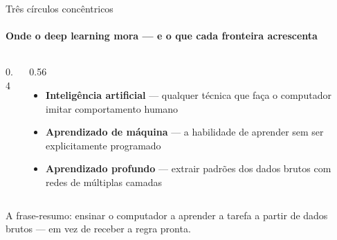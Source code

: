 \documentclass[aspectratio=169, 11pt]{beamer}
\begin{document}
\begin{frame}{Três círculos concêntricos}
  \framesubtitle{Onde o deep learning mora — e o que cada fronteira acrescenta}

  \begin{columns}[T]
    \begin{column}{0.4\textwidth}
      \begin{center}
      \end{center}
    \end{column}
    \begin{column}{0.56\textwidth}
      \begin{itemize}\setlength{\itemsep}{0.35ex}
        \item {\color{icNeural}\textbf{Inteligência artificial}} — qualquer
              técnica que faça o computador imitar comportamento humano
        \item {\color{icAzulClaro}\textbf{Aprendizado de máquina}} — a
              habilidade de aprender sem ser explicitamente programado
        \item {\color{icMagenta}\textbf{Aprendizado profundo}} — extrair
              padrões dos dados brutos com redes de múltiplas camadas
      \end{itemize}
    \end{column}
  \end{columns}

  \begin{ideiabox}
    A frase-resumo: ensinar o computador a aprender a tarefa a partir de dados
    brutos — em vez de receber a regra pronta.
  \end{ideiabox}
\end{frame}
\end{document}
